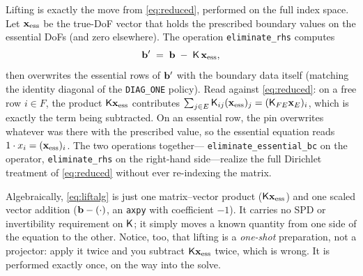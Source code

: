 Lifting is exactly the move from \cref{eq:reduced}, performed on the full index
space. Let $\mathbf{x}_{\mathrm{ess}}$ be the true-DoF vector that holds the prescribed
boundary values on the essential DoFs (and zero elsewhere). The operation
\texttt{eliminate\_rhs} computes
\begin{equation}
  \mathbf{b}' \;=\; \mathbf{b} \;-\; \mathsf{K}\,\mathbf{x}_{\mathrm{ess}},
  \label{eq:liftalg}
\end{equation}
then overwrites the essential rows of $\mathbf{b}'$ with the boundary data itself
(matching the identity diagonal of the \texttt{DIAG\_ONE} policy). Read against
\cref{eq:reduced}: on a free row $i\in F$, the product $\mathsf{K}\mathbf{x}_{\mathrm{ess}}$
contributes $\sum_{j\in E}\mathsf{K}_{ij}(\mathbf{x}_{\mathrm{ess}})_j = (\mathsf{K}_{FE}\mathbf{x}_E)_i$,
which is exactly the term being subtracted. On an essential row, the pin
overwrites whatever was there with the prescribed value, so the essential equation
reads $1\cdot x_i = (\mathbf{x}_{\mathrm{ess}})_i$. The two operations together---
\texttt{eliminate\_essential\_bc} on the operator, \texttt{eliminate\_rhs} on the
right-hand side---realize the full Dirichlet treatment of \cref{eq:reduced}
without ever re-indexing the matrix.

Algebraically, \cref{eq:liftalg} is just one matrix--vector product
($\mathsf{K}\mathbf{x}_{\mathrm{ess}}$) and one scaled vector addition ($\mathbf{b}-(\cdot)$,
an \texttt{axpy} with coefficient $-1$). It carries no SPD or invertibility
requirement on $\mathsf{K}$; it simply moves a known quantity from one side of the
equation to the other. Notice, too, that lifting is a \emph{one-shot}
preparation, not a projector: apply it twice and you subtract
$\mathsf{K}\mathbf{x}_{\mathrm{ess}}$ twice, which is wrong. It is performed exactly once,
on the way into the solve.

